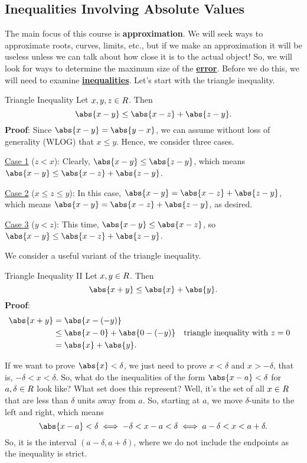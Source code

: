\subsection{Inequalities Involving Absolute Values}
The main focus of this course is \textbf{approximation}. We will seek ways to approximate
roots, curves, limits, etc., but if we make an approximation it will be useless unless we can talk
about how close it is to the actual object! So, we will look for ways to determine the maximum
size of the \underline{\textbf{error}}. Before we do this, we will need to examine \underline{\textbf{inequalities}}.
Let's start with the triangle inequality.
\begin{Theorem}{Triangle Inequality}{}
    Let $ x,y,z\in\relax{R} $. Then
    \[ \abs{x-y}\le \abs{x-z}+\abs{z-y}. \]
    \tcblower{}
    \textbf{Proof}:
    Since $ \abs{x-y}=\abs{y-x} $, we can assume without loss of generality (WLOG) that $ x\le y $.
    Hence, we consider three cases.

    \underline{Case 1} ($ z<x $): Clearly, $ \abs{x-y}\le \abs{z-y} $, which means
    $ \abs{x-y}\le \abs{x-z}+\abs{z-y} $.

    \underline{Case 2} ($ x\le z\le y $): In this case, $ \abs{x-y}=\abs{x-z}+\abs{z-y} $, which means
    $ \abs{x-y}=\abs{x-z}+\abs{z-y} $, as desired.

    \underline{Case 3} ($ y<z $): This time, $ \abs{x-y}\le \abs{x-z} $, so $ \abs{x-y}\le \abs{x-z}+\abs{z-y} $.
\end{Theorem}
We consider a useful variant of the triangle inequality.
\begin{Theorem}{Triangle Inequality II}{}
    Let $ x,y\in\relax{R} $. Then
    \[ \abs{x+y}\le \abs{x}+\abs{y}. \]
    \tcblower{}
    \textbf{Proof}:
    \begin{align*}
        \abs{x+y}
         & =\abs{x-(-y)}                                                           \\
         & \le \abs{x-0}+\abs{0-(-y)} &  & \text{triangle inequality with $ z=0 $} \\
         & =\abs{x}+\abs{y}.
    \end{align*}
\end{Theorem}
If we want to prove $ \abs{x}<\delta $, we just need to prove $ x<\delta $ and $ x>-\delta $, that is,
$ -\delta<x<\delta $. So, what do the inequalities of the form $ \abs{x-a}<\delta $ for
$ a,\delta\in\relax{R} $ look like? What set does this represent? Well, it's the set of all
$ x\in\relax{R} $ that are less than $ \delta $ units away from $ a $. So, starting at $ a $,
we move $ \delta $-units to the left and right, which means
\[ \abs{x-a}<\delta\iff -\delta<x-a<\delta\iff a-\delta<x<a+\delta. \]
So, it is the interval $ (a-\delta,a+\delta) $, where we do not include the endpoints as the inequality is strict.


